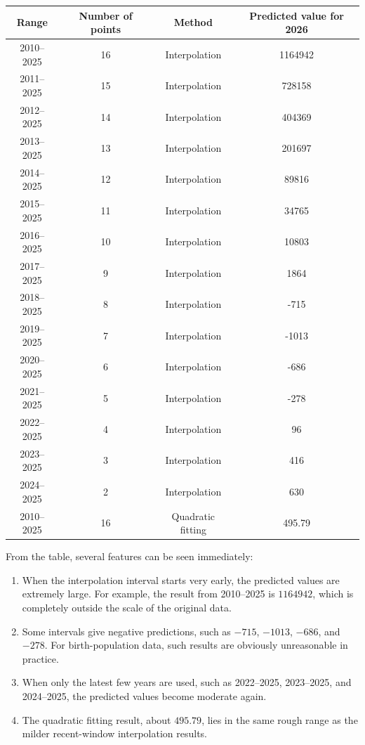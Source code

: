 \documentclass[12pt,a4paper]{article}
\begin{document}
\begin{center}
\begin{tabular}{cccc}
\toprule
Range & Number of points & Method & Predicted value for 2026 \\
\midrule
2010--2025 & 16 & Interpolation & 1164942 \\
2011--2025 & 15 & Interpolation & 728158 \\
2012--2025 & 14 & Interpolation & 404369 \\
2013--2025 & 13 & Interpolation & 201697 \\
2014--2025 & 12 & Interpolation & 89816 \\
2015--2025 & 11 & Interpolation & 34765 \\
2016--2025 & 10 & Interpolation & 10803 \\
2017--2025 & 9  & Interpolation & 1864 \\
2018--2025 & 8  & Interpolation & -715 \\
2019--2025 & 7  & Interpolation & -1013 \\
2020--2025 & 6  & Interpolation & -686 \\
2021--2025 & 5  & Interpolation & -278 \\
2022--2025 & 4  & Interpolation & 96 \\
2023--2025 & 3  & Interpolation & 416 \\
2024--2025 & 2  & Interpolation & 630 \\
\midrule
2010--2025 & 16 & Quadratic fitting & 495.79 \\
\bottomrule
\end{tabular}
\end{center}

From the table, several features can be seen immediately:
\begin{enumerate}[label=(\arabic*)]
    \item When the interpolation interval starts very early, the predicted values are extremely large. For example, the result from 2010--2025 is \(1164942\), which is completely outside the scale of the original data.
    \item Some intervals give negative predictions, such as \(-715\), \(-1013\), \(-686\), and \(-278\). For birth-population data, such results are obviously unreasonable in practice.
    \item When only the latest few years are used, such as 2022--2025, 2023--2025, and 2024--2025, the predicted values become moderate again.
    \item The quadratic fitting result, about \(495.79\), lies in the same rough range as the milder recent-window interpolation results.
\end{enumerate}
\end{document}
